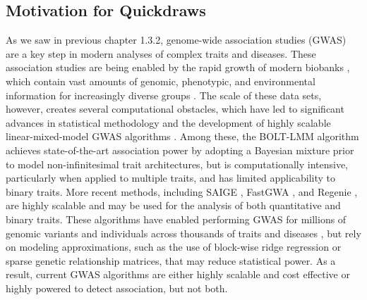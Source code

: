 \subsection{Motivation for Quickdraws}
As we saw in previous chapter 1.3.2, genome-wide association studies (GWAS) are a key step in modern analyses of complex traits and diseases.
%
These association studies are being enabled by the rapid growth of modern biobanks \cite{Bycroft2018,nagai2017overview,ramirez2022all,wojcik2019genetic,chen2011china,kurki2023finngen}, which contain vast amounts of genomic, phenotypic, and environmental information for increasingly diverse groups \cite{zhou2022global}.
%
The scale of these data sets, however, creates several computational obstacles, which have led to significant advances in statistical methodology and the development of highly scalable linear-mixed-model GWAS algorithms \cite{yu2006unified,kang2008efficient,kang2010variance,zhang2010mixed,zhou2012genome,lippert2011fast,segura2012efficient,listgarten2012improved,listgarten2013fast,loh2015efficient,loh2018mixed,jiang2019resource}.
%
Among these, the BOLT-LMM algorithm \cite{loh2015efficient,loh2018mixed} achieves state-of-the-art association power by adopting a Bayesian mixture prior to model non-infinitesimal trait architectures, but is computationally intensive, particularly when applied to multiple traits, and has limited applicability to binary traits.
%
More recent methods, including SAIGE \cite{zhou2018efficiently}, FastGWA \cite{jiang2019resource,jiang2021generalized}, and Regenie \cite{mbatchou2021computationally}, are highly scalable and may be used for the analysis of both quantitative and binary traits.
%
These algorithms have enabled performing GWAS for millions of genomic variants and individuals \cite{yengo2022saturated} across thousands of traits and diseases \cite{wang2021rare}, but rely on modeling approximations, such as the use of block-wise ridge regression
 or sparse genetic relationship matrices, that may reduce statistical power.
%
As a result, current GWAS algorithms are either highly scalable and cost effective or highly powered to detect association, but not both.

